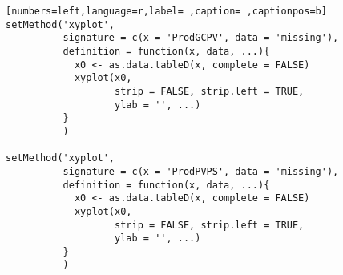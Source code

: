 \begin{lstlisting}[numbers=left,language=r,label= ,caption= ,captionpos=b]
setMethod('xyplot',
          signature = c(x = 'ProdGCPV', data = 'missing'),
          definition = function(x, data, ...){
            x0 <- as.data.tableD(x, complete = FALSE)
            xyplot(x0,
                   strip = FALSE, strip.left = TRUE,
                   ylab = '', ...)
          }
          )

setMethod('xyplot',
          signature = c(x = 'ProdPVPS', data = 'missing'),
          definition = function(x, data, ...){
            x0 <- as.data.tableD(x, complete = FALSE)
            xyplot(x0,
                   strip = FALSE, strip.left = TRUE,
                   ylab = '', ...)
          }
          )
\end{lstlisting}
